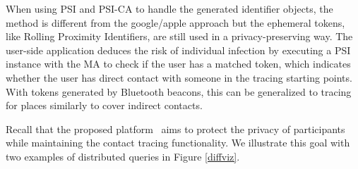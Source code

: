 When using PSI and PSI-CA to handle the generated identifier objects, the method is different from the google/apple approach but the ephemeral tokens, like Rolling Proximity Identifiers, are still used in a privacy-preserving way. The user-side application deduces the risk of individual infection by executing a PSI instance with the MA to check if the user has a matched token, which indicates whether the user has direct contact with someone in the tracing starting points. With tokens generated by Bluetooth beacons, this can be generalized to tracing for places similarly to cover indirect contacts.

Recall that the proposed platform \sysname\ aims to protect the privacy of participants while maintaining the contact tracing functionality. 
We illustrate this goal with two examples of distributed queries in Figure \ref{diffviz}.

